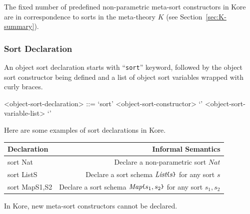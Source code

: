 \documentclass[UTF8,11pt]{article}
\theoremstyle{plain}
\theoremstyle{definition}
\theoremstyle{remark}
\newcommand{\Nat}{\textit{Nat}}
\newcommand{\List}{\textit{List}}
\newcommand{\Map}{\textit{Map}}
\newcommand{\parametric}[2]{{#1}\raisebox{.2ex}{\texttt{\footnotesize{\{}}}#2\raisebox{.2ex}{\texttt{\footnotesize{\}}}}}
\begin{document}
The fixed number of predefined non-parametric meta-sort constructors in Kore 
are in correspondence to sorts in the meta-theory $K$ (see 
Section~\ref{sec:K-summary}).

\subsubsection{Sort Declaration}
\label{sec:kore-syntax-sort-declaration}

An object sort declaration starts with ``\texttt{sort}'' 
keyword, 
followed by the object sort constructor being defined and a list of 
object sort variables wrapped with curly braces.

\begin{grammar}\small\centering
	<object-sort-declaration> ::= `sort' <object-sort-constructor> 
	`{' 
	<object-sort-variable-list> `}'
\end{grammar}

Here are some examples of sort declarations in Kore.
\begin{center}{\ttfamily
		\begin{tabular}{l|r}
			\textrm{Declaration} & \textrm{Informal Semantics}
			\\\hline
			sort \parametric{Nat}{} & \textrm{Declare a non-parametric sort 
			$\Nat$}
			\\\hline
			sort \parametric{List}{S} & \textrm{Declare a sort schema 
			$\parametric{\List}{s}$ for any sort $s$}
			\\\hline
			sort \parametric{Map}{S1,S2} & \textrm{Declare a sort schema 
			$\parametric{\Map}{s_1,s_2}$ for any sort $s_1,s_2$}
		\end{tabular}
	}
\end{center}

In Kore, new meta-sort constructors cannot be declared.
\end{document}
